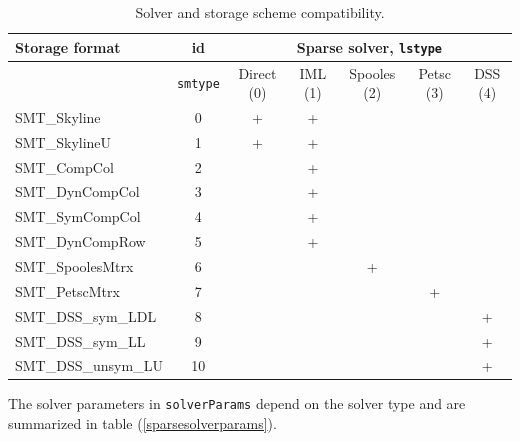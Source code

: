 \documentclass[a4paper]{article}
\newcommand{\param}[1]{\texttt{#1}} %
\begin{document}
\begin{table}[ht]
\begin{center}
\begin{tabular}{|l|c|c|c|c|c|c|}
\hline
Storage format & id & \multicolumn{5}{c|}{Sparse solver, \param{lstype}} \\
\hline
& \param{smtype} & \tiny{Direct (0)} &\tiny{IML (1)}
 &\tiny{Spooles (2)}& \tiny{Petsc (3)}& \tiny{DSS (4)}\\
\hline
\small{SMT\_Skyline}       & 0&+&+& & & \\
\small{SMT\_SkylineU}      & 1&+&+& & & \\
\small{SMT\_CompCol}       & 2& &+& & & \\
\small{SMT\_DynCompCol}    & 3& &+& & & \\
\small{SMT\_SymCompCol}    & 4& &+& & & \\
\small{SMT\_DynCompRow}    & 5& &+& & & \\
\small{SMT\_SpoolesMtrx}   & 6& & &+& & \\
\small{SMT\_PetscMtrx }    & 7& & & &+& \\
\small{SMT\_DSS\_sym\_LDL} & 8& & & & &+\\
\small{SMT\_DSS\_sym\_LL}  & 9& & & & &+\\
\small{SMT\_DSS\_unsym\_LU}&10& & & & &+\\
\hline
\end{tabular}
\caption{Solver and storage scheme compatibility.}
\label{linsolvstoragecompattable}
\end{center}
\end{table}

The solver parameters in \param{solverParams} depend on the solver
type and are summarized in table (\ref{sparsesolverparams}).
\end{document}
